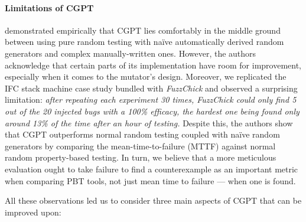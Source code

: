 \documentclass[sigconf,review,anonymous]{acmart}
\newcommand{\fuzzchick}{\textit{FuzzChick}\xspace}
\begin{document}
%
%
\paragraph{Limitations of CGPT}

\citeauthor{lampropoulos2019coverage} demonstrated empirically that CGPT lies
comfortably in the middle ground between using pure random testing with na\"ive
automatically derived random generators and complex manually-written ones.
%
%
However, the authors acknowledge that certain parts of its implementation have
room for improvement, especially when it comes to the mutator's design.
%
%
Moreover, we replicated the IFC stack machine case study bundled with \fuzzchick
and observed a surprising limitation:
%
\emph{after repeating each experiment 30 times, \fuzzchick could only find 5 out
  of the 20 injected bugs with a 100\% efficacy, the hardest one being found
  only around 13\% of the time after an hour of testing.}
%
Despite this, the authors show that CGPT outperforms normal random testing
coupled with na\"ive random generators by comparing the mean-time-to-failure
(MTTF) against normal random property-based testing.
%
In turn, we believe that a more meticulous evaluation ought to take failure to find a
counterexample as an important metric when comparing PBT tools, not just mean
time to failure --- when one is found.
%

All these observations led us to consider three main aspects of CGPT that can be
improved upon:
%
%
%
%
\end{document}
